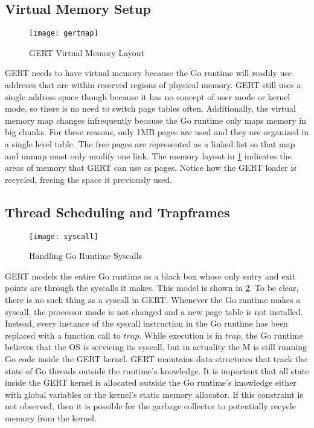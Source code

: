 \subsection{Virtual Memory Setup}
\begin{figure}[h]
\begin{center}
  \texttt{[image: gertmap]}
\end{center}
  \caption{GERT Virtual Memory Layout} \label{fig:gertmap}
\end{figure}

GERT needs to have virtual memory because the Go runtime will readily use addreses that are within
reserved regions of physical memory. GERT still uses a single address space though because it has no concept
of user mode or kernel mode, so there is no need to switch page tables often. Additionally, the virtual memory
map changes infrequently because the Go runtime
only maps memory in big chunks. For these reasons, only 1MB pages are used and they are organized in a single
level table. The free pages are represented as a linked list so that map and unmap must only modify one link.
The memory layout in \ref{fig:gertmap} indicates the areas of memory that GERT can use as pages.
Notice how the GERT loader is recycled, freeing the space it previously used.

\subsection{Thread Scheduling and Trapframes}
\begin{figure}[h]
\begin{center}
  \texttt{[image: syscall]}
\end{center}
  \caption{Handling Go Runtime Syscalls} \label{fig:syscall}
\end{figure}

GERT models the entire Go runtime as a black box whose only entry and exit points
are through the syscalls it makes. This model is shown in \ref{fig:syscall}. To be clear, there is no such thing as a syscall in GERT.
Whenever the Go runtime makes a syscall, the processor mode is not changed and a new page table
is not installed. Instead, every instance of the syscall instruction in the Go runtime has been
replaced with a function call to $trap$. While execution is in $trap$, the Go runtime believes
that the OS is servicing its syscall, but in actuality the M is still running Go code inside
the GERT kernel. GERT maintains data structures that track the state of Go threads
outside the runtime's knowledge. It is important that all state inside the GERT kernel is
allocated outside the Go runtime's knowledge either with global variables or the kernel's
static memory allocator. If this constraint is not observed, then it is possible for the garbage collector
to potentially recycle memory from the kernel.

